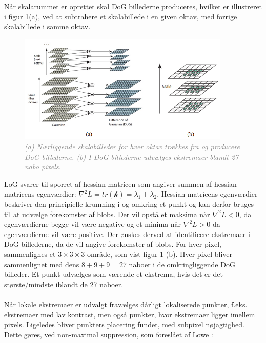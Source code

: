 Når skalarummet er oprettet skal DoG billederne produceres, hvilket er illustreret i figur \ref{fig:difference}(a), ved at subtrahere et skalabillede i en given oktav, med forrige skalabillede i samme oktav.
\begin{figure}[H]
    \centering
    \includegraphics[width=0.90\textwidth]{fig/30.png}
     \vspace{-1em}
    \begin{center}    
       \caption{\textcolor{gray}{\footnotesize \textit{(a) Nærliggende skalabilleder for hver oktav trækkes fra og producere DoG billederne. (b) I DoG billederne udvælges ekstremaer blandt 27 nabo pixels.}}}
    \label{fig:difference}
     \end{center}
     \vspace{-2.5em}
  \end{figure} \noindent
LoG svarer til sporret af hessian matricen som angiver summen af hessian matricens egenværdier: $\nabla^2 L=tr( \mathcal{h} )=\lambda_1+\lambda_2$. Hessian matricens egenværdier beskriver den principielle krumning i og omkring et punkt og kan derfor bruges til at udvælge forekomster af blobs. Der vil opstå et maksima når  $\nabla^2 L<0$, da egenværdierne begge vil være negative og et minima når $\nabla^2 L > 0$ da egenværdierne vil være positive. Der ønskes derved at identificere ekstremaer i DoG billederne, da de vil angive forekomster af blobs. For hver pixel, sammenlignes et $3\times3\times3$ område, som vist figur \ref{fig:difference} (b). Hver pixel bliver sammenlignet med dens $8+9+9=27$ naboer i de omkringliggende DoG billeder. Et punkt udvælges som værende et ekstrema, hvis det er det største/mindste iblandt de 27 naboer.
\\
\\
Når lokale ekstremaer er udvalgt fravælges dårligt lokaliserede punkter, f.eks. ekstremaer med lav kontrast, men også punkter, hvor ekstremaer ligger imellem pixels. Ligeledes bliver punkters placering fundet, med subpixel nøjagtighed. Dette gøres, ved non-maximal suppression, som foreslået af Lowe \cite{nonmaximalsuppression}:
